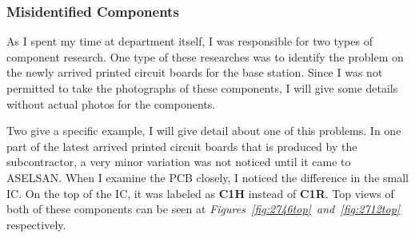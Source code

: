 \subsubsection{Misidentified Components}
\- \indent
	As I spent my time at department itself, I was responsible for two types of component research. One type of these researches was to identify the problem on the newly arrived printed circuit boards for the base station. Since I was not permitted to take the photographs of these components, I will give some details without actual photos for the components. 	
	
	Two give a specific example, I will give detail about one of this problems. In one part of the latest arrived printed circuit boards that is produced by the subcontractor, a very minor variation was not noticed until it came to ASELSAN. When I examine the PCB closely, I noticed the difference in the small IC. On the top of the IC, it was labeled as \textbf{C1H} instead of \textbf{C1R}. Top views of both of these components can be seen at \textit{Figures~\ref{fig:2746top}~and~\ref{fig:2712top}} respectively.  
	 
	


